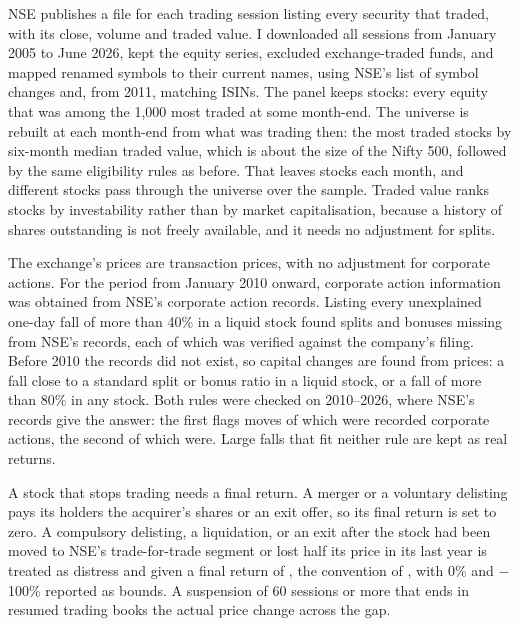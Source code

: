 \documentclass[11pt]{article}
\begin{document}
NSE publishes a file for each trading session listing every security that traded,
with its close, volume and traded value. I downloaded all \NSessionsNse{} sessions
from January 2005 to June 2026, kept the equity series, excluded exchange-traded
funds, and mapped renamed symbols to their current names, using NSE's list of symbol
changes and, from 2011, matching ISINs. The panel keeps \NStocksNse{} stocks: every
equity that was among the 1,000 most traded at some month-end.
The universe is rebuilt at each month-end from what was trading then: the
\PitTopN{} most traded stocks by six-month median traded value, which is about the
size of the Nifty 500, followed by the same eligibility rules as before. That leaves
\PitUniverse{} stocks each month, and \NEverEligible{} different stocks pass through
the universe over the sample. Traded value ranks stocks by investability rather than
by market capitalisation, because a history of shares outstanding is not freely
available, and it needs no adjustment for splits.

The exchange's prices are transaction prices, with no adjustment
for corporate actions. For the period from January 2010 onward,
corporate action information was obtained from NSE's corporate action records.
Listing every unexplained one-day fall of more than 40\% in a liquid
stock found \NMissingSplits{} splits and bonuses missing from NSE's records, each of
which was verified against the company's filing. Before 2010 the records did not exist, so
capital changes are found from prices: a fall close to a standard split or bonus
ratio in a liquid stock, or a fall of more than 80\% in any stock. Both rules were
checked on 2010--2026, where NSE's records give the answer: the first flags
\SplitRuleN{} moves of which \SplitRuleHit{} were recorded corporate actions, the
second \HugeRuleN{} of which \HugeRuleHit{} were. Large falls that fit neither rule are
kept as real returns.


A stock that stops trading needs a final return. A merger or a voluntary delisting
pays its holders the acquirer's shares or an exit offer, so its final return is set
to zero. A compulsory delisting, a liquidation, or an exit after the stock had been
moved to NSE's trade-for-trade segment or lost half its price in its last year is
treated as distress and given a final return of \DistressReturn, the convention of
\citet{shumway1997}, with 0\% and $-$100\% reported as bounds. A suspension of 60
sessions or more that ends in resumed trading books the actual price change across
the gap.
\end{document}
